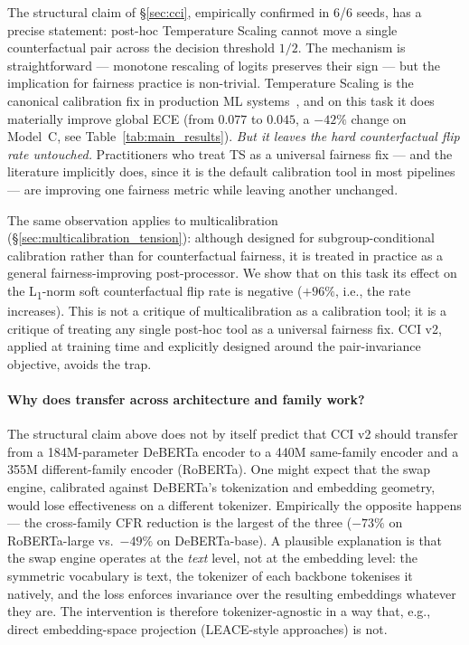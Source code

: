 The structural claim of \S\ref{sec:cci}, empirically confirmed in 6/6 seeds, has a precise statement: post-hoc Temperature Scaling cannot move a single counterfactual pair across the decision threshold $1/2$. The mechanism is straightforward --- monotone rescaling of logits preserves their sign --- but the implication for fairness practice is non-trivial. Temperature Scaling is the canonical calibration fix in production ML systems~\citep{guo2017calibration}, and on this task it does materially improve global ECE (from $0.077$ to $0.045$, a $-42\%$ change on Model~C, see Table~\ref{tab:main_results}). \emph{But it leaves the hard counterfactual flip rate untouched.} Practitioners who treat TS as a universal fairness fix --- and the literature implicitly does, since it is the default calibration tool in most pipelines --- are improving one fairness metric while leaving another unchanged.

The same observation applies to multicalibration (\S\ref{sec:multicalibration_tension}): although designed for subgroup-conditional calibration rather than for counterfactual fairness, it is treated in practice as a general fairness-improving post-processor. We show that on this task its effect on the L\textsubscript{1}-norm soft counterfactual flip rate is negative ($+96\%$, i.e., the rate increases). This is not a critique of multicalibration as a calibration tool; it is a critique of treating any single post-hoc tool as a universal fairness fix. CCI v2, applied at training time and explicitly designed around the pair-invariance objective, avoids the trap.

\paragraph{Why does transfer across architecture and family work?}
The structural claim above does not by itself predict that CCI v2 should transfer from a 184M-parameter DeBERTa encoder to a 440M same-family encoder and a 355M different-family encoder (RoBERTa). One might expect that the swap engine, calibrated against DeBERTa's tokenization and embedding geometry, would lose effectiveness on a different tokenizer. Empirically the opposite happens --- the cross-family CFR reduction is the largest of the three ($-73\%$ on RoBERTa-large vs.\ $-49\%$ on DeBERTa-base). A plausible explanation is that the swap engine operates at the \emph{text} level, not at the embedding level: the symmetric vocabulary is text, the tokenizer of each backbone tokenises it natively, and the loss enforces invariance over the resulting embeddings whatever they are. The intervention is therefore tokenizer-agnostic in a way that, e.g., direct embedding-space projection (LEACE-style approaches) is not.

